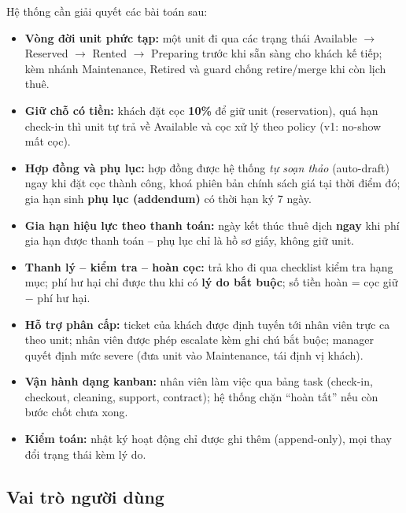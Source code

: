 \documentclass[12pt,a4paper]{article}
\renewcommand{\_}{\textunderscore\allowbreak}
\begin{document}
Hệ thống cần giải quyết các bài toán sau:
\begin{itemize}[leftmargin=*]
    \item \textbf{Vòng đời unit phức tạp:} một unit đi qua các trạng thái Available $\rightarrow$ Reserved $\rightarrow$ Rented $\rightarrow$ Preparing trước khi sẵn sàng cho khách kế tiếp; kèm nhánh Maintenance, Retired và guard chống retire/merge khi còn lịch thuê.
    \item \textbf{Giữ chỗ có tiền:} khách đặt cọc \textbf{10\%} để giữ unit (reservation), quá hạn check-in thì unit tự trả về Available và cọc xử lý theo policy (v1: no-show mất cọc).
    \item \textbf{Hợp đồng và phụ lục:} hợp đồng được hệ thống \textit{tự soạn thảo} (auto-draft) ngay khi đặt cọc thành công, khoá phiên bản chính sách giá tại thời điểm đó; gia hạn sinh \textbf{phụ lục (addendum)} có thời hạn ký 7 ngày.
    \item \textbf{Gia hạn hiệu lực theo thanh toán:} ngày kết thúc thuê dịch \textbf{ngay} khi phí gia hạn được thanh toán -- phụ lục chỉ là hồ sơ giấy, không giữ unit.
    \item \textbf{Thanh lý -- kiểm tra -- hoàn cọc:} trả kho đi qua checklist kiểm tra hạng mục; phí hư hại chỉ được thu khi có \textbf{lý do bắt buộc}; số tiền hoàn = cọc giữ $-$ phí hư hại.
    \item \textbf{Hỗ trợ phân cấp:} ticket của khách được định tuyến tới nhân viên trực ca theo unit; nhân viên được phép escalate kèm ghi chú bắt buộc; manager quyết định mức severe (đưa unit vào Maintenance, tái định vị khách).
    \item \textbf{Vận hành dạng kanban:} nhân viên làm việc qua bảng task (check-in, checkout, cleaning, support, contract); hệ thống chặn ``hoàn tất'' nếu còn bước chốt chưa xong.
    \item \textbf{Kiểm toán:} nhật ký hoạt động chỉ được ghi thêm (append-only), mọi thay đổi trạng thái kèm lý do.
\end{itemize}

\subsection{Vai trò người dùng}
\end{document}
